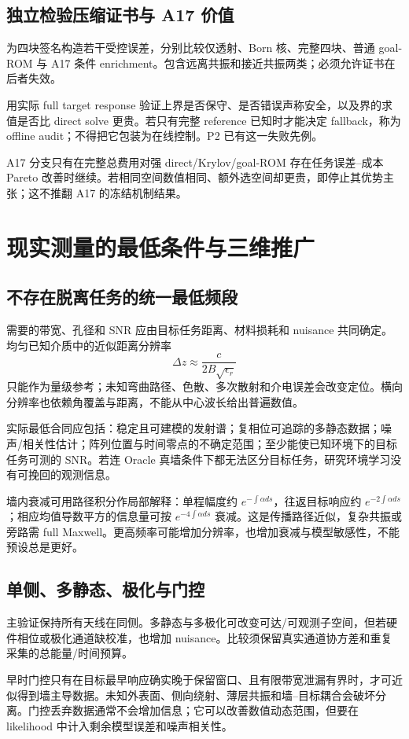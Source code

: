 \subsection{独立检验压缩证书与 A17 价值}
为四块签名构造若干受控误差，分别比较仅透射、Born 核、完整四块、普通 goal-ROM 与 A17 条件 enrichment。包含远离共振和接近共振两类；必须允许证书在后者失效。

用实际 full target response 验证上界是否保守、是否错误声称安全，以及界的求值是否比 direct solve 更贵。若只有完整 reference 已知时才能决定 fallback，称为 offline audit；不得把它包装为在线控制。P2 已有这一失败先例。\cite{R_P2}

A17 分支只有在完整总费用对强 direct/Krylov/goal-ROM 存在任务误差--成本 Pareto 改善时继续。若相同空间数值相同、额外选空间却更贵，即停止其优势主张；这不推翻 A17 的冻结机制结果。

\section{现实测量的最低条件与三维推广}
\subsection{不存在脱离任务的统一最低频段}
需要的带宽、孔径和 SNR 应由目标任务距离、材料损耗和 nuisance 共同确定。均匀已知介质中的近似距离分辨率
\[
\Delta z\approx\frac{c}{2B\sqrt{\epsilon_r}}
\]
只能作为量级参考；未知弯曲路径、色散、多次散射和介电误差会改变定位。横向分辨率也依赖角覆盖与距离，不能从中心波长给出普遍数值。

实际最低合同应包括：稳定且可建模的发射谱；复相位可追踪的多静态数据；噪声/相关性估计；阵列位置与时间零点的不确定范围；至少能使已知环境下的目标任务可测的 SNR。若连 Oracle 真墙条件下都无法区分目标任务，研究环境学习没有可挽回的观测信息。

墙内衰减可用路径积分作局部解释：单程幅度约 $e^{-\int\alpha ds}$，往返目标响应约 $e^{-2\int\alpha ds}$；相应均值导数平方的信息量可按 $e^{-4\int\alpha ds}$ 衰减。这是传播路径近似，复杂共振或旁路需 full Maxwell。更高频率可能增加分辨率，也增加衰减与模型敏感性，不能预设总是更好。

\subsection{单侧、多静态、极化与门控}
主验证保持所有天线在同侧。多静态与多极化可改变可达/可观测子空间，但若硬件相位或极化通道缺校准，也增加 nuisance。比较须保留真实通道协方差和重复采集的总能量/时间预算。

早时门控只有在目标最早响应确实晚于保留窗口、且有限带宽泄漏有界时，才可近似得到墙主导数据。未知外表面、侧向绕射、薄层共振和墙--目标耦合会破坏分离。门控丢弃数据通常不会增加信息；它可以改善数值动态范围，但要在 likelihood 中计入剩余模型误差和噪声相关性。

